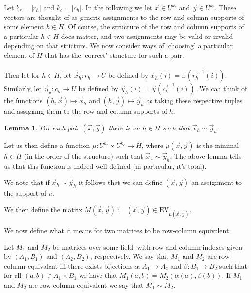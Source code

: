 \documentclass[12pt]{report}
\newtheorem{lem}[thm]{Lemma} \newtheorem{prop}[thm]{Proposition}
\newcommand{\EV}{\text{EV}}
\begin{document}
Let $k_r = \vert r_h \vert$ and $k_c = \vert c_h \vert$. In the following we let
$\vec{x} \in U^{k_r}$ and $\vec{y} \in U^{k_c}$. These vectors are thought of as
generic assignments to the row and column supports of some element $h \in H$. Of
course, the structure of the row and column supports of a particular $h \in H$
does matter, and two assignments may be valid or invalid depending on that
stricture. We now consider ways of `choosing' a particular element of $H$ that
has the `correct' structure for such a pair.
\\~\\
Then let for $h \in H$, let $\vec{x}_h: r_h \rightarrow U$ be defined by
$\vec{x}_h(i) = \vec{x}(\vec{r_h}^{-1}(i))$. Similarly, let $\vec{y}_h: c_h
\rightarrow U$ be defined by $\vec{y}_h(i) = \vec{y}(\vec{c_h}^{-1}(i))$. We can
think of the functions $(h, \vec{x}) \mapsto \vec{x}_h$ and $(h, \vec{y})
\mapsto \vec{y}_h$ as taking these respective tuples and assigning them to the
row and column supports of $h$.

\begin{lem}
  For each pair $(\vec{x}, \vec{y})$ there is an $h \in H$ such that $\vec{x}_h
  \sim \vec{y}_h$.
\end{lem}

Let us then define a function $\mu : U^{k_r} \times U^{k_c} \rightarrow H$,
where $\mu(\vec{x}, \vec{y})$ is the minimal $h \in H$ (in the order of the
structure) such that $\vec{x}_h \sim \vec{y}_h$. The above lemma tells us that
this function is indeed well-defined (in particular, it's total).

We note that if $\vec{x}_h \sim \vec{y}_h$ it follows that we can define
$(\vec{x}, \vec{y})$ an assignment to the support of $h$.

We then define the matrix $M(\vec{x}, \vec{y}) := (\vec{x}, \vec{y}) \in
\EV_{\mu(\vec{x}, \vec{y})}$.


We now define what it means for two matrices to be row-column equivalent.

\begin{definition}
  Let $M_1$ and $M_2$ be matrices over some field, with row and column indexes
  given by $(A_1, B_1)$ and $(A_2, B_2)$, respectively. We say that $M_1$ and
  $M_2$ are row-column equivalent iff there exists bijections $\alpha: A_1
  \rightarrow A_2$ and $\beta: B_1 \rightarrow B_2$ such that for all $(a,b) \in
  A_1 \times B_1$ we have that $M_1(a,b) = M_2 (\alpha (a), \beta (b))$. If
  $M_1$ and $M_2$ are row-column equivalent we say that $M_1 \sim M_2$.
\end{definition}
\end{document}
